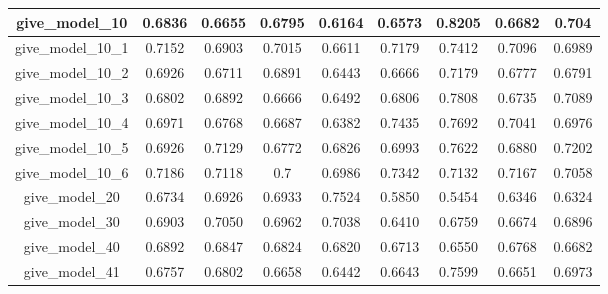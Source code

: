 \begin{table}[!h]
\begin{tabular}{|c|c|c|c|c|c|c|c|c|}
        give\_model\_10                   & 0.6836                        & 0.6655                         & 0.6795                      & 0.6164                  & 0.6573 & 0.8205 & 0.6682 & 0.704  \\ \hline
        give\_model\_10\_1                & 0.7152                        & 0.6903                         & 0.7015                      & 0.6611                  & 0.7179 & 0.7412 & 0.7096 & 0.6989 \\ \hline
        give\_model\_10\_2                & 0.6926                        & 0.6711                         & 0.6891                      & 0.6443                  & 0.6666 & 0.7179 & 0.6777 & 0.6791 \\ \hline
        give\_model\_10\_3                & 0.6802                        & 0.6892                         & 0.6666                      & 0.6492                  & 0.6806 & 0.7808 & 0.6735 & 0.7089 \\ \hline
        give\_model\_10\_4                & 0.6971                        & 0.6768                         & 0.6687                      & 0.6382                  & 0.7435 & 0.7692 & 0.7041 & 0.6976 \\ \hline
        give\_model\_10\_5                & 0.6926                        & 0.7129                         & 0.6772                      & 0.6826                  & 0.6993 & 0.7622 & 0.6880 & 0.7202 \\ \hline
        give\_model\_10\_6                & 0.7186                        & 0.7118                         & 0.7                         & 0.6986                  & 0.7342 & 0.7132 & 0.7167 & 0.7058 \\ \hline
        give\_model\_20                   & 0.6734                        & 0.6926                         & 0.6933                      & 0.7524                  & 0.5850 & 0.5454 & 0.6346 & 0.6324 \\ \hline
        give\_model\_30                   & 0.6903                        & 0.7050                         & 0.6962                      & 0.7038                  & 0.6410 & 0.6759 & 0.6674 & 0.6896 \\ \hline
        give\_model\_40                   & 0.6892                        & 0.6847                         & 0.6824                      & 0.6820                  & 0.6713 & 0.6550 & 0.6768 & 0.6682 \\ \hline
        give\_model\_41                   & 0.6757                        & 0.6802                         & 0.6658                      & 0.6442                  & 0.6643 & 0.7599 & 0.6651 & 0.6973 \\ \hline

\end{tabular}
\end{table}
